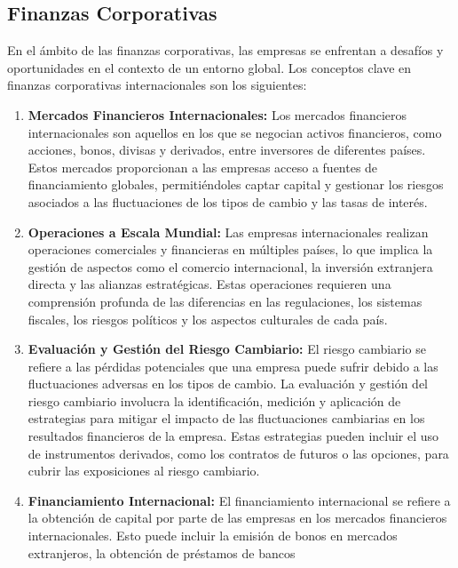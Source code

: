 \documentclass[
  letterpaper,
  DIV=11,
  numbers=noendperiod]{scrartcl}
\begin{document}
\hypertarget{finanzas-corporativas}{%
\subsection{Finanzas Corporativas}\label{finanzas-corporativas}}

En el ámbito de las finanzas corporativas, las empresas se enfrentan a
desafíos y oportunidades en el contexto de un entorno global. Los
conceptos clave en finanzas corporativas internacionales son los
siguientes:

\begin{enumerate}
\def\labelenumi{\arabic{enumi}.}
\item
  \textbf{Mercados Financieros Internacionales:} Los mercados
  financieros internacionales son aquellos en los que se negocian
  activos financieros, como acciones, bonos, divisas y derivados, entre
  inversores de diferentes países. Estos mercados proporcionan a las
  empresas acceso a fuentes de financiamiento globales, permitiéndoles
  captar capital y gestionar los riesgos asociados a las fluctuaciones
  de los tipos de cambio y las tasas de interés.
\item
  \textbf{Operaciones a Escala Mundial:} Las empresas internacionales
  realizan operaciones comerciales y financieras en múltiples países, lo
  que implica la gestión de aspectos como el comercio internacional, la
  inversión extranjera directa y las alianzas estratégicas. Estas
  operaciones requieren una comprensión profunda de las diferencias en
  las regulaciones, los sistemas fiscales, los riesgos políticos y los
  aspectos culturales de cada país.
\item
  \textbf{Evaluación y Gestión del Riesgo Cambiario:} El riesgo
  cambiario se refiere a las pérdidas potenciales que una empresa puede
  sufrir debido a las fluctuaciones adversas en los tipos de cambio. La
  evaluación y gestión del riesgo cambiario involucra la identificación,
  medición y aplicación de estrategias para mitigar el impacto de las
  fluctuaciones cambiarias en los resultados financieros de la empresa.
  Estas estrategias pueden incluir el uso de instrumentos derivados,
  como los contratos de futuros o las opciones, para cubrir las
  exposiciones al riesgo cambiario.
\item
  \textbf{Financiamiento Internacional:} El financiamiento internacional
  se refiere a la obtención de capital por parte de las empresas en los
  mercados financieros internacionales. Esto puede incluir la emisión de
  bonos en mercados extranjeros, la obtención de préstamos de bancos

\end{enumerate}
\end{document}
